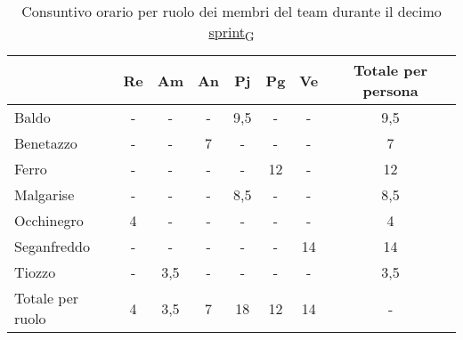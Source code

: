\begin{table}[!h]
    \centering
    \begin{tabular}{ | l | c | c | c | c | c | c | c | }
        \hline
        \textbf{} & \textbf{Re} & \textbf{Am} &\textbf{An} & \textbf{Pj} & \textbf{Pg} & \textbf{Ve} & \textbf{Totale per persona} \\
        \hline
        Baldo            &  -   &  -   &  -   &  9,5 &  -   &  -   &  9,5 \\
        Benetazzo        &  -   &  -   &  7   &  -   &  -   &  -   &  7   \\
        Ferro            &  -   &  -   &  -   &  -   & 12   &  -   & 12   \\
        Malgarise        &  -   &  -   &  -   &  8,5 &  -   &  -   &  8,5 \\
        Occhinegro       &  4   &  -   &  -   &  -   &  -   &  -   &  4   \\
        Seganfreddo      &  -   &  -   &  -   &  -   &  -   & 14   & 14   \\
        Tiozzo           &  -   &  3,5 &  -   &  -   &  -   &  -   &  3,5 \\
        \hline
        Totale per ruolo &  4   &  3,5 &  7   & 18   & 12   & 14   &  -   \\
        \hline
    \end{tabular}
    \caption{Consuntivo orario per ruolo dei membri del team durante il decimo \href{https://7last.github.io/docs/rtb/documentazione-interna/glossario\#sprint}{sprint\textsubscript{G}}}
\end{table}

